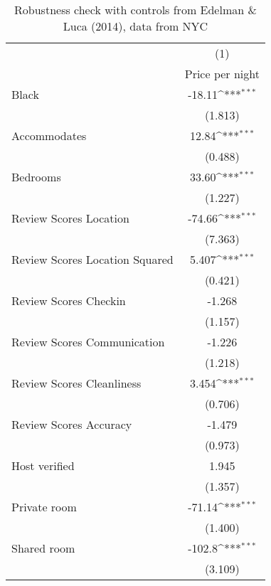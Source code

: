 {
\def\sym#1{\ifmmode^{#1}\else\(^{#1}\)\fi}
\begin{longtable}{l*{1}{c}}
\caption{Robustness check with controls from Edelman \& Luca (2014), data from NYC}\\
\hline\hline\endfirsthead\hline\endhead\hline\endfoot\endlastfoot
                    &\multicolumn{1}{c}{(1)}\\
                    &\multicolumn{1}{c}{Price per night}\\
\hline
Black               &      -18.11\sym{***}\\
                    &     (1.813)         \\
[1em]
Accommodates        &       12.84\sym{***}\\
                    &     (0.488)         \\
[1em]
Bedrooms            &       33.60\sym{***}\\
                    &     (1.227)         \\
[1em]
Review Scores Location&      -74.66\sym{***}\\
                    &     (7.363)         \\
[1em]
Review Scores Location Squared           &       5.407\sym{***}\\
                    &     (0.421)         \\
[1em]
Review Scores Checkin&      -1.268         \\
                    &     (1.157)         \\
[1em]
Review Scores Communication&      -1.226         \\
                    &     (1.218)         \\
[1em]
Review Scores Cleanliness&       3.454\sym{***}\\
                    &     (0.706)         \\
[1em]
Review Scores Accuracy&      -1.479         \\
                    &     (0.973)         \\
[1em]
Host verified &       1.945         \\
                    &     (1.357)         \\
[1em]
Private room        &      -71.14\sym{***}\\
                    &     (1.400)         \\
[1em]
Shared room         &      -102.8\sym{***}\\
                    &     (3.109)         \\

\end{longtable}}
